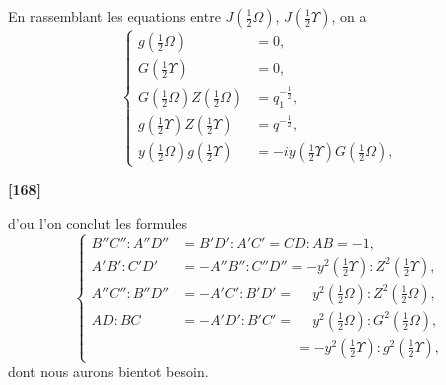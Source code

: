 \documentclass[11pt,a4paper]{article}
\begin{document}
En rassemblant les equations entre $J\left(\frac{1}{2}\Omega\right)$, $J\left(\frac{1}{2}\Upsilon\right)$, on a
\begin{equation}
\left\{
\begin{aligned}
g\left(\tfrac{1}{2}\Omega\right) &= 0,\\
G\left(\tfrac{1}{2}\Upsilon\right) &= 0,\\
G\left(\tfrac{1}{2}\Omega\right) Z\left(\tfrac{1}{2}\Omega\right) &= q_1^{-\frac{1}{2}},\\
g\left(\tfrac{1}{2}\Upsilon\right) Z\left(\tfrac{1}{2}\Upsilon\right) &= q^{-\frac{1}{2}},\\
y\left(\tfrac{1}{2}\Omega\right) g\left(\tfrac{1}{2}\Upsilon\right) &= -iy\left(\tfrac{1}{2}\Upsilon\right) G\left(\tfrac{1}{2}\Omega\right),
\end{aligned}
\right. \tag{31}
\end{equation}

\textbf{[168]}

d'ou l'on conclut les formules
\begin{equation}
\left\{
\begin{aligned}
B''C'' : A''D'' &= B'D' : A'C' = CD : AB = -1,\\
A'B' : C'D' &= -A''B'' : C''D'' = -y^2\left(\tfrac{1}{2}\Upsilon\right) : Z^2\left(\tfrac{1}{2}\Upsilon\right),\\
A''C'' : B''D'' &= -A'C' : B'D' = \phantom{-}y^2\left(\tfrac{1}{2}\Omega\right) : Z^2\left(\tfrac{1}{2}\Omega\right),\\
AD : BC &= -A'D' : B'C' = \phantom{-}y^2\left(\tfrac{1}{2}\Omega\right) : G^2\left(\tfrac{1}{2}\Omega\right),\\
&\phantom{= -A'D' : B'C' = } = -y^2\left(\tfrac{1}{2}\Upsilon\right) : g^2\left(\tfrac{1}{2}\Upsilon\right),
\end{aligned}
\right. \tag{32}
\end{equation}
dont nous aurons bientot besoin.
\end{document}
